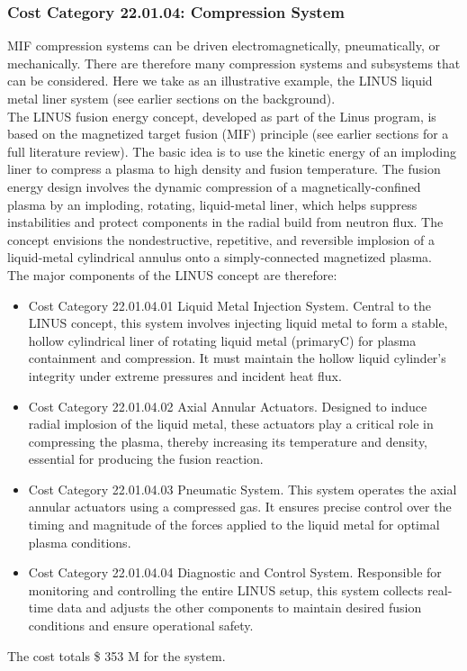 \subsubsection*{Cost Category 22.01.04: Compression System}

MIF compression systems can be driven electromagnetically, pneumatically, or mechanically.  There are therefore many compression systems and subsystems that can be considered.  Here we take as an illustrative example, the LINUS liquid metal liner system (see earlier sections on the background).\\

The LINUS fusion energy concept, developed as part of the Linus program, is based on the magnetized target fusion (MIF) principle (see earlier sections for a full literature review). The basic idea is to use the kinetic energy of an imploding liner to compress a plasma to high density and fusion temperature. The fusion energy design involves the dynamic compression of a magnetically-confined plasma by an imploding, rotating, liquid-metal liner, which helps suppress instabilities and protect components in the radial build from neutron flux. The concept envisions the nondestructive, repetitive, and reversible implosion of a liquid-metal cylindrical annulus onto a simply-connected magnetized plasma.\\

The major components of the LINUS concept are therefore:

\begin{itemize}
  \item Cost Category 22.01.04.01 Liquid Metal Injection System. Central to the LINUS concept, this system involves injecting liquid metal to form a stable, hollow cylindrical liner of rotating liquid metal (primaryC) for plasma containment and compression. It must maintain the hollow liquid cylinder's integrity under extreme pressures and incident heat flux.

    \item Cost Category 22.01.04.02 Axial Annular Actuators. Designed to induce radial implosion of the liquid metal, these actuators play a critical role in compressing the plasma, thereby increasing its temperature and density, essential for producing the fusion reaction.

    \item Cost Category 22.01.04.03 Pneumatic System. This system operates the axial annular actuators using a compressed gas. It ensures precise control over the timing and magnitude of the forces applied to the liquid metal for optimal plasma conditions.

    \item Cost Category 22.01.04.04 Diagnostic and Control System. Responsible for monitoring and controlling the entire LINUS setup, this system collects real-time data and adjusts the other components to maintain desired fusion conditions and ensure operational safety.
\end{itemize}

The cost totals \$ 353 M for the system.

